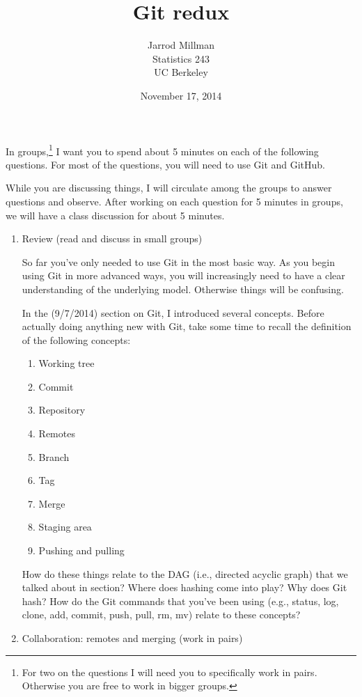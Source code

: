 \documentclass{article}
\title{Git redux}
\date{November 17, 2014}
\author{Jarrod Millman\\ Statistics 243\\ UC Berkeley}
\begin{document}
\maketitle

In groups,\footnote{For two on the questions I will need you to specifically
work in pairs. Otherwise you are free to work in bigger groups.} I want you to
spend about 5 minutes on each of the following questions.  For most of the
questions, you will need to use Git and GitHub.

While you are discussing things, I will circulate among the groups to answer
questions and observe.  After working on each question for 5 minutes in groups,
we will have a class discussion for about 5 minutes.

\begin{enumerate}

\item Review (read and discuss in small groups)

So far you've only needed to use Git in the most basic way.  As you begin using
Git in more advanced ways, you will increasingly need to have a clear
understanding of the underlying model.  Otherwise things will be confusing.

In the (9/7/2014) section on Git, I introduced several concepts.  Before actually
doing anything new with Git, take some time to recall the definition of the
following concepts:

\begin{enumerate}
\item Working tree
\item Commit
\item Repository
\item Remotes
\item Branch
\item Tag
\item Merge
\item Staging area
\item Pushing and pulling
\end{enumerate}

How do these things relate to the DAG (i.e., directed acyclic graph) that we
talked about in section?  Where does hashing come into play?  Why does Git hash?
How do the Git commands that you've been using (e.g., status, log, clone, add, commit,
push, pull, rm, mv) relate to these concepts? 

\item Collaboration: remotes and merging (work in pairs)


\end{enumerate}
\end{document}
